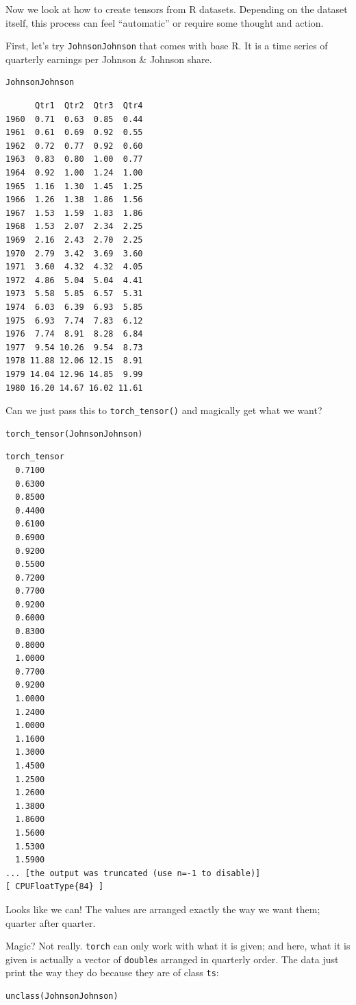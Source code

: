 \documentclass[
  letterpaper,
]{krantz}
\begin{document}
Now we look at how to create tensors from R datasets. Depending on the
dataset itself, this process can feel ``automatic'' or require some
thought and action.

First, let's try \texttt{JohnsonJohnson} that comes with base R. It is a
time series of quarterly earnings per Johnson \& Johnson share.

\begin{verbatim}
JohnsonJohnson
\end{verbatim}

\begin{verbatim}
      Qtr1  Qtr2  Qtr3  Qtr4
1960  0.71  0.63  0.85  0.44
1961  0.61  0.69  0.92  0.55
1962  0.72  0.77  0.92  0.60
1963  0.83  0.80  1.00  0.77
1964  0.92  1.00  1.24  1.00
1965  1.16  1.30  1.45  1.25
1966  1.26  1.38  1.86  1.56
1967  1.53  1.59  1.83  1.86
1968  1.53  2.07  2.34  2.25
1969  2.16  2.43  2.70  2.25
1970  2.79  3.42  3.69  3.60
1971  3.60  4.32  4.32  4.05
1972  4.86  5.04  5.04  4.41
1973  5.58  5.85  6.57  5.31
1974  6.03  6.39  6.93  5.85
1975  6.93  7.74  7.83  6.12
1976  7.74  8.91  8.28  6.84
1977  9.54 10.26  9.54  8.73
1978 11.88 12.06 12.15  8.91
1979 14.04 12.96 14.85  9.99
1980 16.20 14.67 16.02 11.61
\end{verbatim}

Can we just pass this to \texttt{torch\_tensor()} and magically get what
we want?

\begin{verbatim}
torch_tensor(JohnsonJohnson)
\end{verbatim}

\begin{verbatim}
torch_tensor
  0.7100
  0.6300
  0.8500
  0.4400
  0.6100
  0.6900
  0.9200
  0.5500
  0.7200
  0.7700
  0.9200
  0.6000
  0.8300
  0.8000
  1.0000
  0.7700
  0.9200
  1.0000
  1.2400
  1.0000
  1.1600
  1.3000
  1.4500
  1.2500
  1.2600
  1.3800
  1.8600
  1.5600
  1.5300
  1.5900
... [the output was truncated (use n=-1 to disable)]
[ CPUFloatType{84} ]
\end{verbatim}

Looks like we can! The values are arranged exactly the way we want them;
quarter after quarter.

Magic? Not really. \texttt{torch} can only work with what it is given;
and here, what it is given is actually a vector of \texttt{double}s
arranged in quarterly order. The data just print the way they do because
they are of class \texttt{ts}:

\begin{verbatim}
unclass(JohnsonJohnson)
\end{verbatim}
\end{document}
